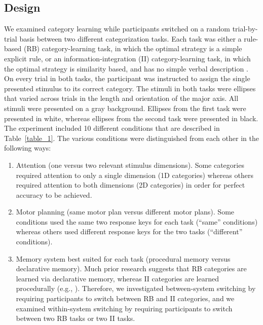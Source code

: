 \documentclass[doc, floatsintext]{apa7}
\begin{document}
\subsection{Design}
We examined category learning while participants switched on
a random trial-by-trial basis between two different
categorization tasks. Each task was either a rule-based (RB)
category-learning task, in which the optimal strategy is a
simple explicit rule, or an information-integration (II)
category-learning task, in which the optimal strategy is
similarity based, and has no simple verbal description
\parencite{ashby_neuropsychological_1998,
ashby_decision_1988}. On every trial in both tasks, the
participant was instructed to assign the single presented
stimulus to its correct category. The stimuli in both tasks
were ellipses that varied across trials in the length and
orientation of the major axis. All stimuli were presented on
a gray background. Ellipses from the first task were
presented in white, whereas ellipses from the second task
were presented in black. The experiment included 10
different conditions that are described in
Table~\ref{table_1}. The various conditions were
distinguished from each other in the following ways:

\begin{enumerate}
\item Attention (one versus two relevant stimulus
    dimensions). Some categories required attention to only
        a single dimension (1D categories) whereas others
        required attention to both dimensions (2D
        categories) in order for perfect accuracy to be
        achieved.

\item Motor planning (same motor plan versus different motor
    plans). Some conditions used the same two response keys
        for each task (``same'' conditions) whereas others
        used different response keys for the two tasks
        (``different'' conditions).

\item Memory system best suited for each task  (procedural
    memory versus declarative memory). Much prior research
        suggests that RB categories are learned via
        declarative memory, whereas II categories are
        learned procedurally (e.g., \cite{ashby_human_2010,
        ashby_multiple_2017, smith_implicit_2012-1}).
        Therefore, we investigated between-system switching
        by requiring participants to switch between RB and
        II categories, and we examined within-system
        switching by requiring participants to switch
        between two RB tasks or two II tasks.
\end{enumerate}
\end{document}
